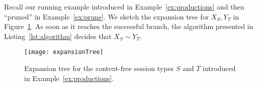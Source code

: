 \begin{example}
	Recall our running example introduced in Example~\ref{ex:productions} and then
	``pruned'' in Example~\ref{ex:prune}. We sketch the expansion tree for
	$X_S, Y_T$ in Figure~\ref{fig:expansionTree}. As soon as it reaches
	the successful branch, the algorithm presented in Listing~\ref{lst:algorithm}
	decides that $X_S\sim Y_T$.
\end{example}

\begin{figure}[h]
\centering
	\texttt{[image: expansionTree]}
	\caption{Expansion tree for the context-free session types $S$ and $T$
	introduced in Example~\ref{ex:productions}.}
	\label{fig:expansionTree}
\end{figure}

